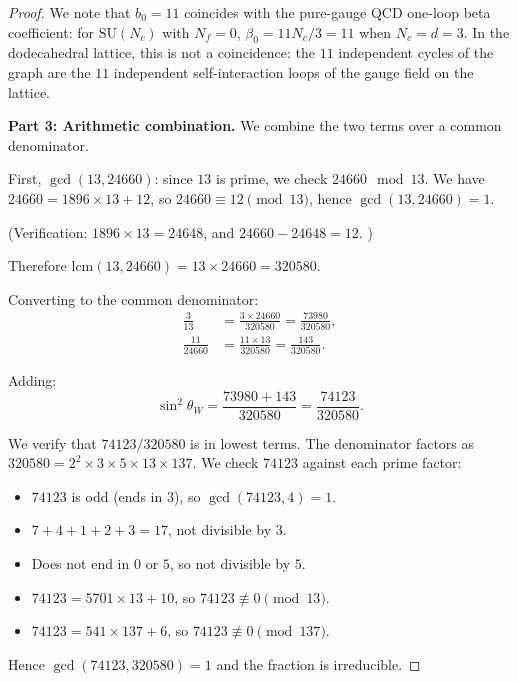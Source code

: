 \documentclass[11pt,a4paper]{article}
\theoremstyle{plain}
\theoremstyle{definition}
\newcommand{\sw}{\sin^{2}\!\theta_{W}}
\begin{document}
\begin{proof}
We note that $b_{0} = 11$ coincides with the pure-gauge QCD one-loop
beta coefficient: for $\mathrm{SU}(N_{c})$ with $N_{f} = 0$,
$\beta_{0} = 11N_{c}/3 = 11$ when $N_{c} = d = 3$.  In the
dodecahedral lattice, this is not a coincidence: the $11$ independent
cycles of the graph are the $11$ independent self-interaction loops of
the gauge field on the lattice.

\medskip
\noindent\textbf{Part 3: Arithmetic combination.}
We combine the two terms over a common denominator.

First, $\gcd(13, 24660)$: since $13$ is prime, we check
$24660 \mod 13$.  We have $24660 = 1896 \times 13 + 12$, so
$24660 \equiv 12 \pmod{13}$, hence $\gcd(13, 24660) = 1$.

(Verification: $1896 \times 13 = 24648$, and $24660 - 24648 = 12$.
\checkmark)

Therefore $\mathrm{lcm}(13, 24660) = 13 \times 24660 = 320580$.

Converting to the common denominator:
\begin{align}
  \frac{3}{13} &= \frac{3 \times 24660}{320580} = \frac{73980}{320580},
  \label{eq:conv1}\\[4pt]
  \frac{11}{24660} &= \frac{11 \times 13}{320580} = \frac{143}{320580}.
  \label{eq:conv2}
\end{align}

Adding:
\begin{equation}\label{eq:sum}
  \sw = \frac{73980 + 143}{320580} = \frac{74123}{320580}.
\end{equation}

We verify that $74123/320580$ is in lowest terms.  The denominator
factors as $320580 = 2^{2} \times 3 \times 5 \times 13 \times 137$.
We check $74123$ against each prime factor:
\begin{itemize}[nosep]
  \item $74123$ is odd (ends in $3$), so $\gcd(74123, 4) = 1$.
  \item $7 + 4 + 1 + 2 + 3 = 17$, not divisible by $3$.
  \item Does not end in $0$ or $5$, so not divisible by $5$.
  \item $74123 = 5701 \times 13 + 10$, so $74123 \not\equiv 0 \pmod{13}$.
  \item $74123 = 541 \times 137 + 6$, so $74123 \not\equiv 0 \pmod{137}$.
\end{itemize}
Hence $\gcd(74123, 320580) = 1$ and the fraction is irreducible.


\end{proof}
\end{document}
